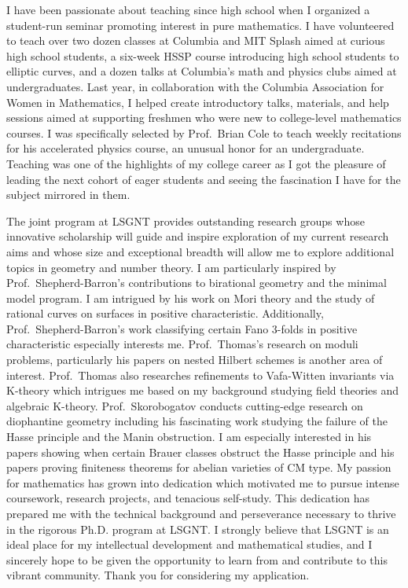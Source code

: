 \documentclass[11pt]{article}
\begin{document}
I have been passionate about teaching since high school when I organized a student-run seminar promoting interest in pure mathematics. I have volunteered to teach over two dozen classes at Columbia and MIT Splash aimed at curious high school students, a six-week HSSP course introducing high school students to elliptic curves, and a dozen talks at Columbia's math and physics clubs aimed at undergraduates. Last year, in collaboration with the Columbia Association for Women in Mathematics, I helped create introductory talks, materials, and help sessions aimed at supporting freshmen who were new to college-level mathematics courses. I was specifically selected by Prof.\ Brian Cole to teach weekly recitations for his accelerated physics course, an unusual honor for an undergraduate. Teaching was one of the highlights of my college career as I got the pleasure of leading the next cohort of eager students and seeing the fascination I have for the subject mirrored in them.
\par
The joint program at LSGNT provides outstanding research groups whose innovative scholarship will guide and inspire exploration of my current research aims and whose size and exceptional breadth will allow me to explore additional topics in geometry and number theory. I am particularly inspired by Prof.\ Shepherd-Barron’s contributions to birational geometry and the minimal model program. I am intrigued by his work on Mori theory and the study of rational curves on surfaces in positive characteristic. Additionally, Prof.\ Shepherd-Barron’s work classifying certain Fano 3-folds in positive characteristic especially interests me. Prof.\ Thomas’s research on moduli problems, particularly his papers on nested Hilbert schemes is another area of interest. Prof.\ Thomas also researches refinements to Vafa-Witten invariants via K-theory which intrigues me based on my background studying field theories and algebraic K-theory. Prof.\ Skorobogatov conducts cutting-edge research on diophantine geometry including his fascinating work studying the failure of the Hasse principle and the Manin obstruction. I am especially interested in his papers showing when certain Brauer classes obstruct the Hasse principle and his papers proving finiteness theorems for abelian varieties of CM type. My passion for mathematics has grown into dedication which motivated me to pursue intense coursework, research projects, and tenacious self-study. This dedication has prepared me with the technical background and perseverance necessary to thrive in the rigorous Ph.D. program at LSGNT. I strongly believe that LSGNT is an ideal place for my intellectual development and mathematical studies, and I sincerely hope to be given the opportunity to learn from and contribute to this vibrant community. Thank you for considering my application.
\end{document}
